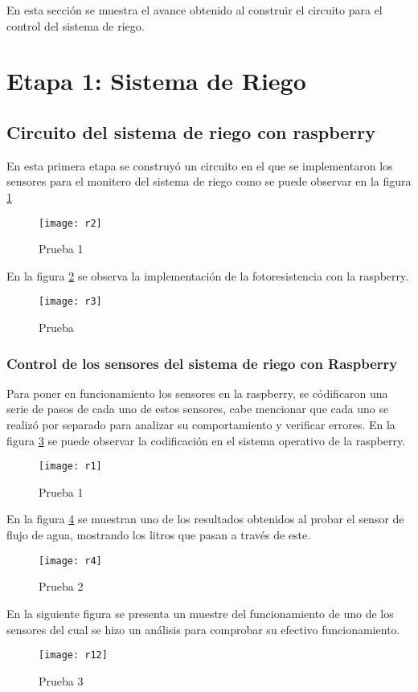 En esta secci\'on se muestra el avance obtenido al construir el circuito para el control del sistema de riego.
\section{Etapa 1: Sistema de Riego}
\subsection{Circuito del sistema de riego con raspberry}
En esta primera etapa se construy\'o un circuito en el que se implementaron los sensores para el monitero del sistema de riego como se puede observar en la figura \ref{r2}

\begin{figure}[H]
	\begin{center}
		\texttt{[image: r2]}
	\end{center}
	\caption{Prueba 1}
	\label{r2}
\end{figure} 

En la figura \ref{r3} se observa la implementaci\'on de la fotoresistencia con la raspberry. 
\begin{figure}[H]
	\begin{center}
		\texttt{[image: r3]}
	\end{center}
	\caption{Prueba}
	\label{r3}
\end{figure} 


\subsubsection{Control de los sensores del sistema de riego con Raspberry}
Para poner en funcionamiento los sensores en la raspberry, se c\'odificaron una serie de pasos de cada uno de estos sensores, cabe mencionar que cada uno se realiz\'o por separado para analizar su comportamiento y verificar errores. En la figura \ref{r1} se puede observar la codificaci\'on en el sistema operativo de la raspberry.
\begin{figure}[H]
\begin{center}
	\texttt{[image: r1]}
\end{center}
	\caption{Prueba 1}
	\label{r1}
\end{figure} 

En la figura \ref{r4} se muestran uno de los resultados obtenidos al probar el sensor de flujo de agua, mostrando los litros que pasan a trav\'es de este. 
\begin{figure}[H]
	\begin{center}
		\texttt{[image: r4]}
	\end{center}
	\caption{Prueba 2}
	\label{r4}
\end{figure} 

En la siguiente figura se presenta un muestre del funcionamiento de uno de los sensores del cual se hizo un an\'alisis para comprobar su efectivo funcionamiento.
\begin{figure}[H]
	\begin{center}
		\texttt{[image: r12]}
	\end{center}
	\caption{Prueba 3}
	\label{r12}
\end{figure} 


